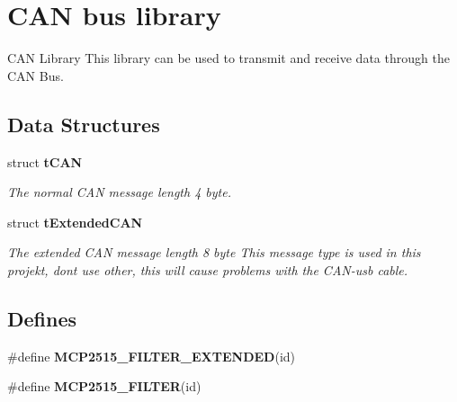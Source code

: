 \section{\-C\-A\-N bus library}
\label{group__can}


\-C\-A\-N \-Library \-This library can be used to transmit and receive data through the \-C\-A\-N \-Bus.  


\subsection*{\-Data \-Structures}
\begin{DoxyCompactItemize}
\item 
struct {\bf t\-C\-A\-N}
\begin{DoxyCompactList}\small\item\em \-The normal \-C\-A\-N message length 4 byte. \end{DoxyCompactList}\item 
struct {\bf t\-Extended\-C\-A\-N}
\begin{DoxyCompactList}\small\item\em \-The extended \-C\-A\-N message length 8 byte \-This message type is used in this projekt, dont use other, this will cause problems with the \-C\-A\-N-\/usb cable. \end{DoxyCompactList}\end{DoxyCompactItemize}
\subsection*{\-Defines}
\begin{DoxyCompactItemize}
\item 
\#define {\bfseries \-M\-C\-P2515\-\_\-\-F\-I\-L\-T\-E\-R\-\_\-\-E\-X\-T\-E\-N\-D\-E\-D}(id)
\item 
\#define {\bfseries \-M\-C\-P2515\-\_\-\-F\-I\-L\-T\-E\-R}(id)
\end{DoxyCompactItemize}
